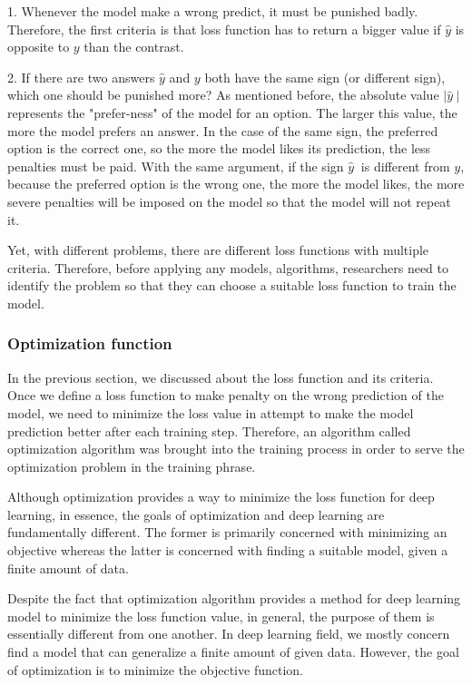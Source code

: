 	1. Whenever the model make a wrong predict, it must be punished badly. Therefore, the first criteria is that loss function has to return a bigger value if $\hat{y}$ is opposite to $y$ than the contrast.
	
	2. If there are two answers $\hat{y}$ and $y$ both have the same sign (or different sign), which one should be punished more? As mentioned before, the absolute value $| \hat{y}\ |$ represents the "prefer-ness" of the model for an option. The larger this value, the more the model prefers an answer. In the case of the same sign, the preferred option is the correct one, so the more the model likes its prediction, the less penalties must be paid. With the same argument, if the sign $ \hat{y}\ $ is different from $y$, because the preferred option is the wrong one, the more the model likes, the more severe penalties will be imposed on the model so that the model will not repeat it. 

	Yet, with different problems, there are different loss functions with multiple criteria. Therefore, before applying any models, algorithms, researchers need to identify the problem so that they can choose a suitable loss function to train the model.

\subsubsection{Optimization function}
\noindent

	In the previous section, we discussed about the loss function and its criteria. Once we define a loss function to make penalty on the wrong prediction of the model, we need to minimize the loss value in attempt to make the model prediction better after each training step. Therefore, an algorithm called optimization algorithm was brought into the training process in order to serve the optimization problem in the training phrase.
	
	Although optimization provides a way to minimize the loss function for deep learning, in essence, the goals of optimization and deep learning are fundamentally different. The former is primarily concerned with minimizing an objective whereas the latter is concerned with finding a suitable model, given a finite amount of data.
	
	Despite the fact that optimization algorithm provides a method for deep learning model to minimize the loss function value, in general, the purpose of them is essentially different from one another. In deep learning field, we mostly concern find a model that can generalize a finite amount of given data. However, the goal of optimization is to minimize the objective function.
	

